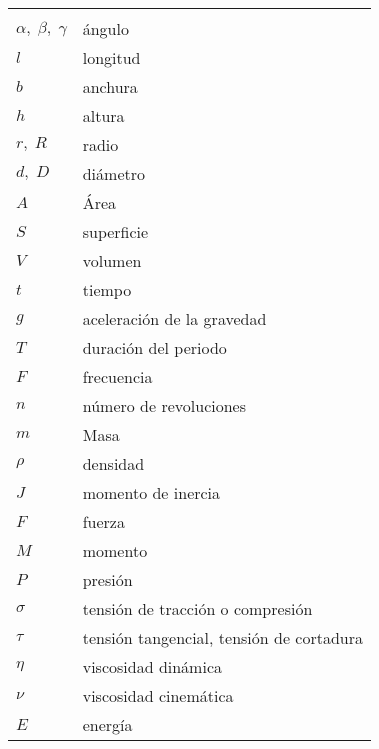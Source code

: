 \begin{mytable}[H]
	\centering
	\begin{tabular}{ll}
		\multicolumn{1}{c}{\quad\quad\quad} & \multicolumn{1}{c}{} \\
		$\alpha, \; \beta, \; \gamma$ & ángulo \\	
		$l$\quad\quad\quad& longitud \\
		$b$ & anchura \\
		$h$ & altura \\
		$r, \; R$ & radio \\
		$d,\; D$ & diámetro \\
		$A$ & Área \\
		$S$ & superficie \\
		$V$ & volumen \\
		$t$ & tiempo \\
		$g$ & aceleración de la gravedad \\
		$T$ & duración del periodo \\
		$F$ & frecuencia \\
		$n$ & número de revoluciones \\
		$m$ & Masa \\
		$\rho$ & densidad \\
		$J$ & momento de inercia \\
		$F$ & fuerza \\
		$M$ & momento \\
		$P$ & presión \\
		$\sigma$ & tensión de tracción o compresión \\
		$\tau$ & tensión tangencial, tensión de cortadura \\
		$\eta$ & viscosidad dinámica \\
		$\nu$ & viscosidad cinemática \\
		$E$ & energía \\

\end{tabular}
\end{mytable}
